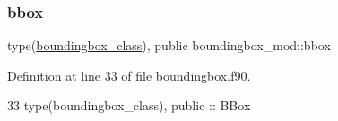 \subsubsection{\texorpdfstring{bbox}{bbox}}
{\footnotesize\ttfamily type(\mbox{\hyperlink{structboundingbox__mod_1_1boundingbox__class}{boundingbox\+\_\+class}}), public boundingbox\+\_\+mod\+::bbox}



Definition at line 33 of file boundingbox.\+f90.


\begin{DoxyCode}
33     \textcolor{keywordtype}{type}(boundingbox\_class), \textcolor{keywordtype}{public} :: BBox
\end{DoxyCode}
